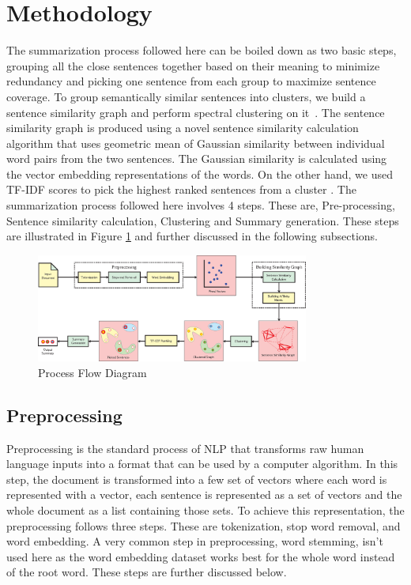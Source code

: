 \documentclass[acmlarge]{acmart}
\begin{document}
\section{Methodology}\label{sec:methodology}
The summarization process followed here can be boiled down as two basic steps, grouping all the close sentences together based on their meaning to minimize redundancy and picking one sentence from each group to maximize sentence coverage. To group semantically similar sentences into clusters, we build a sentence similarity graph and perform spectral clustering on it~\cite{roychowdhury-etal-2022-spectral-base}. The sentence similarity graph is produced using a novel sentence similarity calculation algorithm that uses geometric mean of Gaussian similarity between individual word pairs from the two sentences. The Gaussian similarity is calculated using the vector embedding representations of the words. On the other hand, we used TF-IDF scores to pick the highest ranked sentences from a cluster \cite{Akter-2017-tfidf-3, das-2022-tfidf, sarkar-2012-tfidf, sarkar-2012-tfidf-2}. The summarization process followed here involves 4 steps. These are, Pre-processing, Sentence similarity calculation, Clustering and Summary generation. These steps are illustrated in Figure \ref{fig:process-flow-diagram} and further discussed in the following subsections. 

\begin{figure}
	\centering
	\includegraphics[width=0.8\textwidth]{figs/process-flow-diagram-new}
	\caption{Process Flow Diagram}
	\label{fig:process-flow-diagram}
\end{figure}

\subsection{Preprocessing}\label{subsec:preprocessing}
Preprocessing is the standard process of NLP that transforms raw human language inputs into a format that can be used by a computer algorithm. In this step, the document is transformed into a few set of vectors where each word is represented with a vector, each sentence is represented as a set of vectors and the whole document as a list containing those sets. To achieve this representation, the preprocessing follows three steps. These are tokenization, stop word removal, and word embedding. A very common step in preprocessing, word stemming, isn't used here as the word embedding dataset works best for the whole word instead of the root word. These steps are further discussed below.
\end{document}
